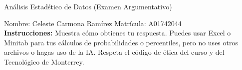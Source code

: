 \documentclass[8pt]{report}
\begin{document}
\newpage



\begin{center}
{An\'alisis Estad\'stico de Datos (Examen Argumentativo)}
\end{center}

Nombre: \underline{\hspace*{.2in}}
Celeste Carmona Ramírez
\underline{\hspace*{.2in}} \quad Matr\'icula:\underline{\hspace*{.2in}}
A01742044
\underline{\hspace*{.2in}} \\

{\bf Instrucciones:} Muestra c\'omo obtienes tu respuesta. Puedes usar Excel 
o Minitab para tus cálculos de probabilidades o 
percentiles, pero no uses otros archivos o hagas uso de la IA. Respeta el 
c\'odigo de \'etica del curso y del Tecnol\'ogico 
de Monterrey.
\end{document}
